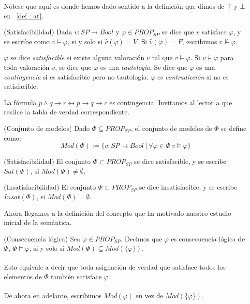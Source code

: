 Nótese que aquí es donde hemos dado sentido a la definición que dimos de $\top$ y $\bot$ en ~\ref{def : at}.

\begin{definition}(Satisfacibilidad) Dada $v: SP \rightarrow Bool$ y $\varphi \in PROP_{SP}$ se dice que $v$ satisface $\varphi$, y se escribe como $v \vDash \varphi$, si y solo si $\hat{v}(\varphi) = V$. Si $\hat{v}(\varphi) = F$, escribimos $v \nvDash \varphi$.
\end{definition}

\begin{definition} $\varphi$ se dice \textit{satisfacible} si existe alguna valoración $v$ tal que $v \vDash \varphi$. Si $v \vDash \varphi$ para toda valoración $v$, se dice que $\varphi$ es una \textit{tautología}. Se dice que $\varphi$ es una \textit{contingencia} si es satisfacible pero no tautología. $\varphi$ es \textit{contradicción} si no es satisfacible. 
\end{definition}

\begin{example} La fórmula $p \land q \rightarrow r \leftrightarrow p \rightarrow q \rightarrow r$ es contingencia. Invitamos al lector a que realice la tabla de verdad correspondiente.
\end{example}

\begin{definition}(Conjunto de modelos) Dado $\Phi \subseteq PROP_{SP}$, el conjunto de modelos de $\Phi$ se define como:
$$Mod(\Phi) := \{v: SP \rightarrow Bool \ | \ \forall \varphi \in \Phi \ v \vDash \varphi \}$$
\end{definition}

\begin{definition}(Satisfacibilidad) El conjunto $\Phi \subset PROP_{SP}$ se dice satisfacible, y se escribe $Sat(\Phi)$, si $Mod(\Phi) \neq \emptyset$.
\end{definition}

\begin{definition}(Insatisfacibilidad) El conjunto $\Phi \subset PROP_{SP}$ se dice insatisfacible, y se escribe $Insat(\Phi)$, si $Mod(\Phi) = \emptyset$. 
\end{definition}

Ahora llegamos a la definición del concepto que ha motivado nuestro estudio inicial de la semántica.

\begin{definition}(Consecuencia lógica) Sea $\varphi \in PROP_{SP}$. Decimos que $\varphi$ es consecuencia lógica de $\Phi$, $\Phi \vDash \varphi$, si y solo si $Mod(\Phi) \subseteq Mod(\{\varphi\})$. \\ \\
Esto equivale a decir que toda asignación de verdad que satisface todos los elementos de $\Phi$ también satisface $\varphi$.\\ \\
\noindent De ahora en adelante, escribimos $Mod(\varphi)$ en vez de $Mod(\{\varphi\})$.
\end{definition}

